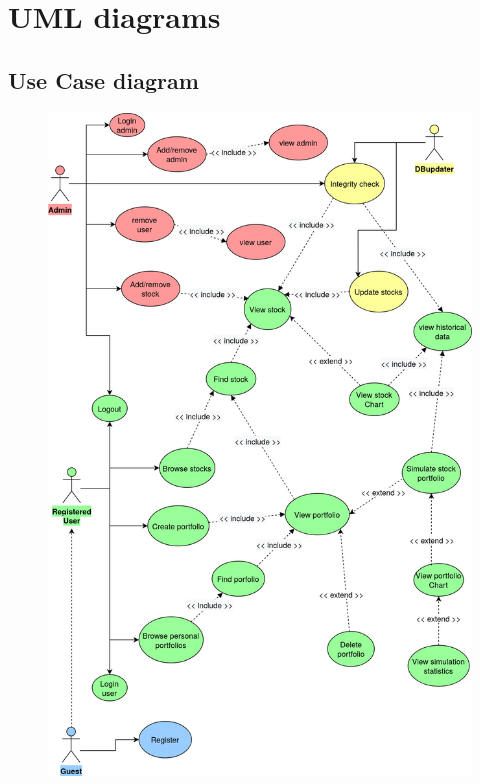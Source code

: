 \chapter{UML diagrams}
\section{Use Case diagram}
\begin{figure}[H]
	\begin{center}
		\includegraphics[scale=0.22]{img/use_case.jpg}
	\end{center}
\end{figure}
